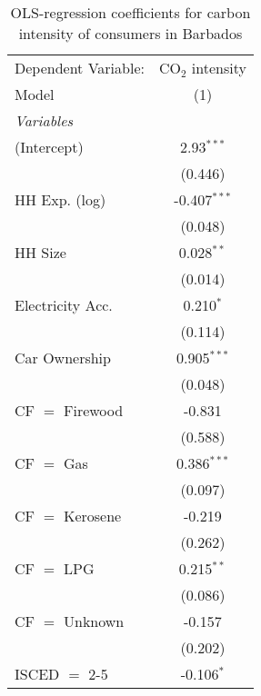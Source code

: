 
\begin{table}[htbp!]
   \centering
   \small
   \begin{adjustbox}{width = 1\textwidth, max height = 0.95\textheight, center}
      \begin{threeparttable}[b]
         \caption{\label{tab:OLS_1_BRB} OLS-regression coefficients for carbon intensity of consumers in Barbados}
         \begin{tabular}{lc}
            \tabularnewline \midrule \midrule
            Dependent Variable: & CO$_{2}$ intensity\\  
            Model               & (1)\\  
            \midrule
            \emph{Variables}\\
            (Intercept)         & 2.93$^{***}$\\   
                                & (0.446)\\   
            HH Exp. (log)       & -0.407$^{***}$\\   
                                & (0.048)\\   
            HH Size             & 0.028$^{**}$\\   
                                & (0.014)\\   
            Electricity Acc.    & 0.210$^{*}$\\   
                                & (0.114)\\   
            Car Ownership       & 0.905$^{***}$\\   
                                & (0.048)\\   
            CF $=$ Firewood     & -0.831\\   
                                & (0.588)\\   
            CF $=$ Gas          & 0.386$^{***}$\\   
                                & (0.097)\\   
            CF $=$ Kerosene     & -0.219\\   
                                & (0.262)\\   
            CF $=$ LPG          & 0.215$^{**}$\\   
                                & (0.086)\\   
            CF $=$ Unknown      & -0.157\\   
                                & (0.202)\\   
            ISCED $=$ 2-5       & -0.106$^{*}$\\   

\end{tabular}
\end{threeparttable}
\end{adjustbox}
\end{table}
